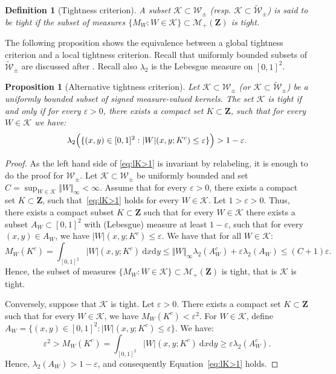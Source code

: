 \documentclass{amsart}
\theoremstyle{plain}
\newtheorem{prop}[Th]{Proposition}
\newtheorem{defi}[Th]{Definition}
\theoremstyle{definition}
\newcommand{\Space}{\mathbf{Z}}
\newcommand{\signed}{\pm}
\newcommand{\ck}{\mathcal{K}}
\newcommand{\Meas}{\mathcal{M}_+(\Space)}
\newcommand{\Kernel}{\mathcal{W}_{\signed}}
\newcommand{\UKernel}{\widetilde{\mathcal{W}}_{\signed}}
\newcommand{\TM}[1]{\norm{#1}_\infty}
\newcommand{\drv}{\mathrm{d}}
\newcommand{\norm}[1]{\Vert#1\Vert}
\newcommand{\eps}{\varepsilon}
\begin{document}
\begin{defi}[Tightness criterion]
  \label{defi:tight}
  A subset  $\mathcal{K}\subset \Kernel$ (resp. $\mathcal{K}\subset \UKernel$)
   is said  to be
  tight      if     the      subset     of  measures
  $\{ M_W : W\in\mathcal{K} \} \subset \Meas$ is tight.
\end{defi}

The following proposition shows the equivalence between a global tightness criterion
and a local tightness criterion.
Recall that uniformly bounded subsets of $\UKernel$ are discussed after  . Recall also $\lambda_2$ is the Lebesgue measure on $[0, 1]^2$.

\begin{prop}[Alternative tightness criterion]
  \label{prop:tight}
  Let $\ck\subset \Kernel$ (or  $\ck\subset \UKernel$) be a uniformly bounded subset  of  signed measure-valued  kernels.
  The set $\ck$ is tight if and only if
  for every $\eps>0$, there exists a compact set $K \subset \Space$, 
  such that for every $W\in \mathcal{K}$ we have:
\begin{equation}
   \label{eq:lK>1}
    \lambda_2 \Bigl( \{ (x,y)\in [0,1]^2 : \vert W\vert(x,y; K^c) \leq \eps \} \Bigr) >  1-\eps.
  \end{equation} 
\end{prop}

\begin{proof}
  As the left hand side of \eqref{eq:lK>1} is invariant by relabeling,
  	it is enough to do the proof for $\Kernel$.
  Let   $\ck\subset    \Kernel$   be    uniformly   bounded    and   set
  $C= \sup_{W\in  \ck} \TM{W} <\infty$.  Assume that  for every  $\eps>0$, there
  exists  a compact  set $K  \subset \Space$,  such that~\eqref{eq:lK>1}
  holds for every  $W\in \mathcal{K}$.  Let $1 > \eps  > 0$. Thus, there
  exists  a  compact  subset  $K\subset  \Space$  such  that  for  every
  $W\in \mathcal{K}$  there exists a  subset $A_W  \subset [0,1]^2$
  with  (Lebesgue)  measure  at  least $1-\eps$,  such  that  for  every
  $(x,y)\in A_W$, we have $\vert W\vert(x,y;K^c) \leq \eps$.
We have that for all $W\in \ck$:
\[
M_W(K^c) = \int_{[0,1]^2} \vert W\vert(x,y;K^c)\ \drv x\drv y
\leq  \TM{W} \lambda_2 (A_W^c )+ \varepsilon \lambda_2(A_W)
\leq  (C+1) \varepsilon. 
\]
Hence, the subset of   measures 
$\{ M_W : W\in\mathcal{K} \} \subset \Meas$ is tight,
that is  $\mathcal{K}$ is tight.

\medskip

Conversely, suppose that $\mathcal{K}$ is  tight.  Let $\eps >0$.
There  exists  a compact  set  $K\subset  \Space$  such that  for  every
$W\in    \mathcal{K}$,   we    have    $M_W(K^c)   < \eps^2$.     For
$W\in                        \mathcal{K}$,                        define
$A_W = \{ (x,y) \in [0,1]^2 : \vert W\vert(x,y;K^c) \leq \eps \}$.  We have:
\[
  \eps^2 >  M_W(K^c)
  = \int_{[0,1]^2} \vert W\vert(x,y;K^c)\ \drv x\drv y 
  \geq \varepsilon \lambda_2(A_W^c).
\]
Hence, $\lambda_2(A_W) >  1 - \eps$,
and consequently Equation~\eqref{eq:lK>1}
holds. 
\end{proof}
\end{document}
